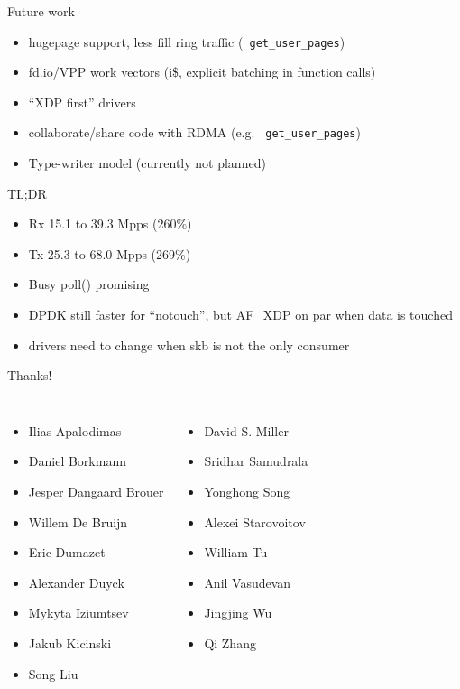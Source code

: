 \documentclass[aspectratio=169]{beamer}
\begin{document}
  \begin{frame}{Future work}
    \begin{itemize}
    \item hugepage support, less fill ring traffic ({\tt
      get\_user\_pages})
    \item fd.io/VPP work vectors (i\$, explicit batching in function calls)
    \item ``XDP first'' drivers 
    \item collaborate/share code with RDMA (e.g. {\tt
      get\_user\_pages})
    \item Type-writer model (currently not planned)
    \end{itemize}
  \end{frame}

  \begin{frame}{TL;DR}
  \begin{itemize}
  \item Rx 15.1 to 39.3 Mpps (260\%)
  \item Tx 25.3 to 68.0 Mpps (269\%)
  \item Busy poll() promising
  \item DPDK still faster for ``notouch'', but AF\_XDP on par when data is touched
  \item drivers need to change when skb is not the only consumer
  \end{itemize}
  \end{frame}

  \begin{frame}{Thanks!}
  \begin{columns}[T,onlytextwidth]
    \begin{itemize}
    \item Ilias Apalodimas
    \item Daniel Borkmann
    \item Jesper Dangaard Brouer
    \item Willem De Bruijn
    \item Eric Dumazet
    \item Alexander Duyck
    \item Mykyta Iziumtsev
    \item Jakub Kicinski
    \item Song Liu
    \end{itemize}
    
    \begin{itemize}
    \item David S. Miller
    \item Sridhar Samudrala
    \item Yonghong Song
    \item Alexei Starovoitov
    \item William Tu
    \item Anil Vasudevan
    \item Jingjing Wu
    \item Qi Zhang
    \end{itemize}
  \end{columns}
  \end{frame}
\end{document}
